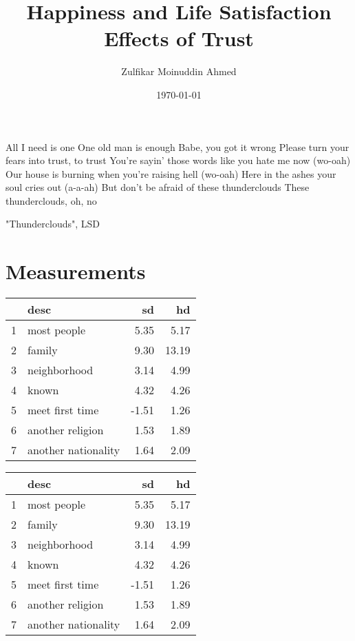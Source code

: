 \documentclass{amsart}
\title{Happiness and Life Satisfaction Effects of Trust}
\author{Zulfikar Moinuddin Ahmed}
\date{\today}
\begin{document}
\maketitle
\epigraph{All I need is one
One old man is enough
Babe, you got it wrong
Please turn your fears into trust, to trust
You're sayin' those words like you hate me now (wo-oah)
Our house is burning when you're raising hell (wo-oah)
Here in the ashes your soul cries out (a-a-ah)
But don't be afraid of these thunderclouds
These thunderclouds, oh, no
}{"Thunderclouds", LSD}

\section{Measurements}
\begin{table}[ht]
\centering
\begin{tabular}{rlrr}
  \hline
 & desc & sd & hd \\ 
  \hline
1 & most people & 5.35 & 5.17 \\ 
  2 & family & 9.30 & 13.19 \\ 
  3 & neighborhood & 3.14 & 4.99 \\ 
  4 & known & 4.32 & 4.26 \\ 
  5 & meet first time & -1.51 & 1.26 \\ 
  6 & another religion & 1.53 & 1.89 \\ 
  7 & another nationality & 1.64 & 2.09 \\ 
   \hline
\end{tabular}
\end{table}

\begin{table}[ht]
\centering
\begin{tabular}{rlrr}
  \hline
 & desc & sd & hd \\ 
  \hline
1 & most people & 5.35 & 5.17 \\ 
  2 & family & 9.30 & 13.19 \\ 
  3 & neighborhood & 3.14 & 4.99 \\ 
  4 & known & 4.32 & 4.26 \\ 
  5 & meet first time & -1.51 & 1.26 \\ 
  6 & another religion & 1.53 & 1.89 \\ 
  7 & another nationality & 1.64 & 2.09 \\ 
   \hline
\end{tabular}
\end{table}
\end{document}
